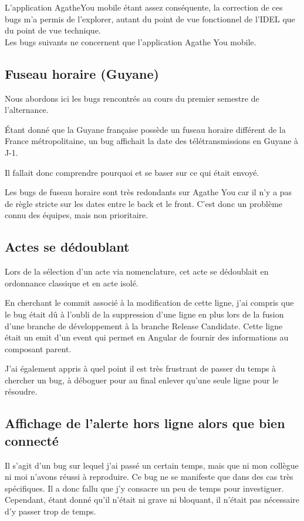 \documentclass{article}
\begin{document}
L'application AgatheYou mobile étant assez conséquente, la correction de ces bugs m'a permis de l'explorer, autant du point de vue fonctionnel de l'IDEL que du point de vue technique. \\

Les bugs suivants ne concernent que l'application Agathe You mobile.

\subsection{Fuseau horaire (Guyane)}

Nous abordons ici les bugs rencontrés au cours du premier semestre de l'alternance.

Étant donné que la Guyane française possède un fuseau horaire différent de la France métropolitaine, un bug affichait la date des télétransmissions en Guyane à J-1.

Il fallait donc comprendre pourquoi et se baser sur ce qui était envoyé.

Les bugs de fuseau horaire sont très redondants sur Agathe You car il n'y a pas de règle stricte sur les dates entre le back et le front.
C'est donc un problème connu des équipes, mais non prioritaire.

\subsection{Actes se dédoublant}

Lors de la sélection d'un acte via nomenclature, cet acte se dédoublait en ordonnance classique et en acte isolé.

En cherchant le commit associé à la modification de cette ligne, j'ai compris que le bug était dû à l'oubli de la suppression d'une ligne en plus lors de la fusion d'une branche de développement à la branche Release Candidate. Cette ligne était un emit d'un event qui permet en Angular de fournir des informations au composant parent.

J'ai également appris à quel point il est très frustrant de passer du temps à chercher un bug, à déboguer pour au final enlever qu'une seule ligne pour le résoudre.

\subsection{Affichage de l'alerte hors ligne alors que bien connecté}

Il s'agit d'un bug sur lequel j'ai passé un certain temps, mais que ni mon collègue ni moi n'avons réussi à reproduire.
Ce bug ne se manifeste que dans des cas très spécifiques. Il a donc fallu que j'y consacre un peu de temps pour investiguer. Cependant, étant donné qu'il n'était ni grave ni bloquant, il n'était pas nécessaire d'y passer trop de temps.
\end{document}
